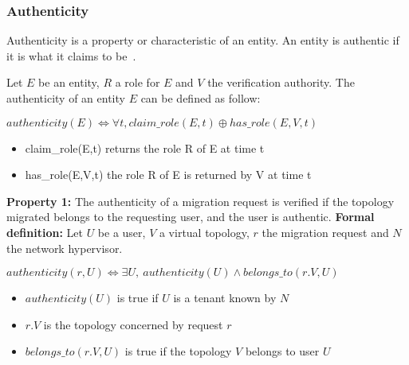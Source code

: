 \subsubsection{Authenticity}
\label{sec:prop-auth}
Authenticity is a property or characteristic of an entity.
An entity is authentic if it is what it claims to be~\cite{ISO/IEC270012013}.

Let $E$ be an entity, $R$ a role for $E$ and $V$ the verification authority.
The authenticity of an entity $E$ can be defined as follow:

\begin{myformula}
$ authenticity(E) \Leftrightarrow \forall t, claim\_role(E,t) \oplus has\_role(E,V,t)$
\end{myformula}
\begin{itemize}
\item claim\_role(E,t) returns the role R of E at time t
\item has\_role(E,V,t) the role R of E is returned by V at time t
\end{itemize}

\textbf{Property 1:} The authenticity of a migration request is verified if the topology migrated belongs to the requesting user, and the user is authentic.
\newline
\textbf{Formal definition: } Let $U$ be a user, $V$ a virtual topology, $r$ the migration request and $N$ the network hypervisor.

\begin{myformula}
$ authenticity(r,U) \Leftrightarrow \exists U,~authenticity(U) \wedge belongs\_to(r.V,U)$
\end{myformula}
\begin{itemize}
\item $authenticity(U)$ is true if $U$ is a tenant known by $N$
\item $r.V$ is the topology concerned by request $r$
\item $belongs\_to(r.V,U)$ is true if the topology $V$ belongs to user $U$
\end{itemize}


